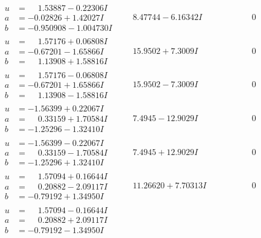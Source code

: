 \documentclass[1p]{elsarticle_modified}
\theoremstyle{definition}
\begin{document}
$$\begin{array}{c|c|c}
\begin{aligned}
u &= \phantom{-}1.53887 - 0.22306 I \\
a &= -0.02826 + 1.42027 I \\
b &= -0.950908 - 1.004730 I\end{aligned}
 & \phantom{-}8.47744 - 6.16342 I & \phantom{-0.000000 } 0 \\ \hline\begin{aligned}
u &= \phantom{-}1.57176 + 0.06808 I \\
a &= -0.67201 - 1.65866 I \\
b &= \phantom{-}1.13908 + 1.58816 I\end{aligned}
 & \phantom{-}15.9502 + 7.3009 I & \phantom{-0.000000 } 0 \\ \hline\begin{aligned}
u &= \phantom{-}1.57176 - 0.06808 I \\
a &= -0.67201 + 1.65866 I \\
b &= \phantom{-}1.13908 - 1.58816 I\end{aligned}
 & \phantom{-}15.9502 - 7.3009 I & \phantom{-0.000000 } 0 \\ \hline\begin{aligned}
u &= -1.56399 + 0.22067 I \\
a &= \phantom{-}0.33159 + 1.70584 I \\
b &= -1.25296 - 1.32410 I\end{aligned}
 & \phantom{-}7.4945 - 12.9029 I & \phantom{-0.000000 } 0 \\ \hline\begin{aligned}
u &= -1.56399 - 0.22067 I \\
a &= \phantom{-}0.33159 - 1.70584 I \\
b &= -1.25296 + 1.32410 I\end{aligned}
 & \phantom{-}7.4945 + 12.9029 I & \phantom{-0.000000 } 0 \\ \hline\begin{aligned}
u &= \phantom{-}1.57094 + 0.16644 I \\
a &= \phantom{-}0.20882 - 2.09117 I \\
b &= -0.79192 + 1.34950 I\end{aligned}
 & \phantom{-}11.26620 + 7.70313 I & \phantom{-0.000000 } 0 \\ \hline\begin{aligned}
u &= \phantom{-}1.57094 - 0.16644 I \\
a &= \phantom{-}0.20882 + 2.09117 I \\
b &= -0.79192 - 1.34950 I\end{aligned}

\end{array}$$
\end{document}
